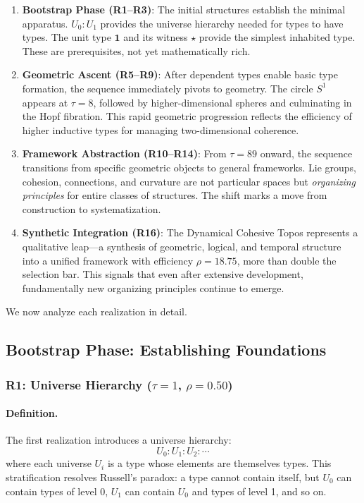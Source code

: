 \documentclass[11pt]{article}
\theoremstyle{definition}
\begin{document}
\begin{enumerate}[leftmargin=*]
\item \textbf{Bootstrap Phase (R1--R3)}: The initial structures establish the minimal apparatus. $U_0 : U_1$ provides the universe hierarchy needed for types to have types. The unit type $\mathbf{1}$ and its witness $\star$ provide the simplest inhabited type. These are prerequisites, not yet mathematically rich.

\item \textbf{Geometric Ascent (R5--R9)}: After dependent types enable basic type formation, the sequence immediately pivots to geometry. The circle $S^1$ appears at $\tau=8$, followed by higher-dimensional spheres and culminating in the Hopf fibration. This rapid geometric progression reflects the efficiency of higher inductive types for managing two-dimensional coherence.

\item \textbf{Framework Abstraction (R10--R14)}: From $\tau=89$ onward, the sequence transitions from specific geometric objects to general frameworks. Lie groups, cohesion, connections, and curvature are not particular spaces but \emph{organizing principles} for entire classes of structures. The shift marks a move from construction to systematization.

\item \textbf{Synthetic Integration (R16)}: The Dynamical Cohesive Topos represents a qualitative leap—a synthesis of geometric, logical, and temporal structure into a unified framework with efficiency $\rho = 18.75$, more than double the selection bar. This signals that even after extensive development, fundamentally new organizing principles continue to emerge.
\end{enumerate}

We now analyze each realization in detail.

\subsection{Bootstrap Phase: Establishing Foundations}

\subsubsection{R1: Universe Hierarchy ($\tau=1$, $\rho=0.50$)}

\paragraph{Definition.}
The first realization introduces a universe hierarchy:
\[
U_0 : U_1 : U_2 : \cdots
\]
where each universe $U_i$ is a type whose elements are themselves types. This stratification resolves Russell's paradox: a type cannot contain itself, but $U_0$ can contain types of level 0, $U_1$ can contain $U_0$ and types of level 1, and so on.
\end{document}
